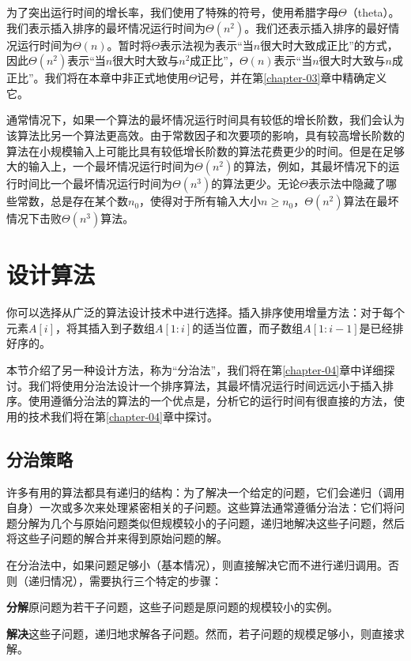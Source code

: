 \documentclass[lang=cn,newtx,10pt,scheme=chinese]{elegantbook}
\begin{document}
为了突出运行时间的增长率，我们使用了特殊的符号，使用希腊字母$\Theta$（theta）。我们表示插入排序的最坏情况运行时间为$\Theta(n^2)$。我们还表示插入排序的最好情况运行时间为$\Theta(n)$。暂时将$\Theta$表示法视为表示``当$n$很大时大致成正比''的方式，因此$\Theta(n^2)$表示``当$n$很大时大致与$n^2$成正比''，$\Theta(n)$表示``当$n$很大时大致与$n$成正比''。我们将在本章中非正式地使用$\Theta$记号，并在第\ref{chapter-03}章中精确定义它。

通常情况下，如果一个算法的最坏情况运行时间具有较低的增长阶数，我们会认为该算法比另一个算法更高效。由于常数因子和次要项的影响，具有较高增长阶数的算法在小规模输入上可能比具有较低增长阶数的算法花费更少的时间。但是在足够大的输入上，一个最坏情况运行时间为$\Theta(n^2)$的算法，例如，其最坏情况下的运行时间比一个最坏情况运行时间为$\Theta(n^3)$的算法更少。无论$\Theta$表示法中隐藏了哪些常数，总是存在某个数$n_0$，使得对于所有输入大小$n\ge n_0$，$\Theta(n^2)$算法在最坏情况下击败$\Theta(n^3)$算法。

\section{设计算法}\label{section-2.3}

你可以选择从广泛的算法设计技术中进行选择。插入排序使用增量方法：对于每个元素$A[i]$，将其插入到子数组$A[1:i]$的适当位置，而子数组$A[1:i-1]$是已经排好序的。

本节介绍了另一种设计方法，称为``分治法''，我们将在第\ref{chapter-04}章中详细探讨。我们将使用分治法设计一个排序算法，其最坏情况运行时间远远小于插入排序。使用遵循分治法的算法的一个优点是，分析它的运行时间有很直接的方法，使用的技术我们将在第\ref{chapter-04}章中探讨。

\subsection{分治策略}\label{subsection-2.3.1}

许多有用的算法都具有递归的结构：为了解决一个给定的问题，它们会递归（调用自身）一次或多次来处理紧密相关的子问题。这些算法通常遵循分治法：它们将问题分解为几个与原始问题类似但规模较小的子问题，递归地解决这些子问题，然后将这些子问题的解合并来得到原始问题的解。

在分治法中，如果问题足够小（基本情况），则直接解决它而不进行递归调用。否则（递归情况），需要执行三个特定的步骤：

\textbf{分解}原问题为若干子问题，这些子问题是原问题的规模较小的实例。

\textbf{解决}这些子问题，递归地求解各子问题。然而，若子问题的规模足够小，则直接求解。
\end{document}
